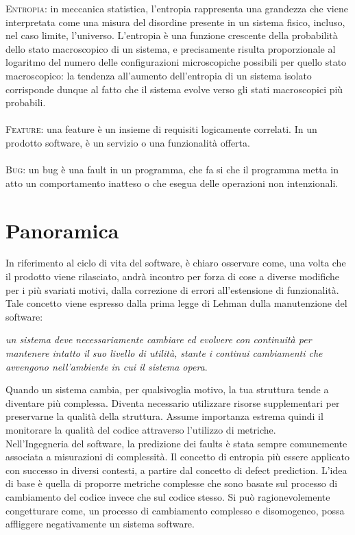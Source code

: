 \textsc{Entropia}: in meccanica statistica, l'entropia rappresenta una grandezza che viene interpretata come una misura del disordine presente in un sistema fisico, incluso, nel caso limite, l'universo. L'entropia è una funzione crescente della probabilità dello stato macroscopico di un sistema, e precisamente risulta proporzionale al logaritmo del numero delle configurazioni microscopiche possibili per quello stato macroscopico: la tendenza all'aumento dell'entropia di un sistema isolato corrisponde dunque al fatto che il sistema evolve verso gli stati macroscopici più probabili. \\ \\
\textsc{Feature}: una feature è un insieme di requisiti logicamente correlati. In un prodotto software, è un servizio o una funzionalità offerta.
\\ \\
\textsc{Bug}: un bug è una fault in un programma, che fa si che il programma metta in atto un comportamento inatteso o che esegua delle operazioni non intenzionali.
\section{Panoramica}

In riferimento al ciclo di vita del software, è chiaro osservare come, una volta che il prodotto viene rilasciato, andrà incontro per forza di cose a diverse modifiche per i più svariati motivi, dalla correzione di errori all'estensione di funzionalità. Tale concetto viene espresso dalla prima legge di Lehman dulla manutenzione del software:
\begin{center}
\textit{un sistema deve necessariamente cambiare ed evolvere con continuità per mantenere intatto il suo livello di utilità, stante i continui cambiamenti che avvengono nell'ambiente in cui il sistema opera}.
\end{center}
Quando un sistema cambia, per qualsivoglia motivo, la tua struttura tende a diventare più complessa. Diventa necessario utilizzare risorse supplementari per preservarne la qualità della struttura. Assume importanza estrema quindi il monitorare la qualità del codice attraverso l'utilizzo di metriche.\\

Nell'Ingegneria del software, la predizione dei faults è stata sempre comunemente associata a misurazioni di complessità. Il concetto di entropia più essere applicato con successo in diversi contesti, a partire dal concetto di defect prediction. L'idea di base è quella di proporre metriche complesse che sono basate sul processo di cambiamento del codice invece che sul codice stesso. Si può ragionevolemente congetturare come, un processo di cambiamento complesso e disomogeneo, possa affliggere negativamente un sistema software. 

